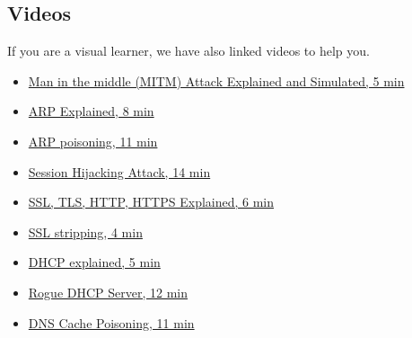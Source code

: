 \subsection{Videos}
If you are a visual learner, we have also linked videos to help you. \\
\begin{itemize}
    \item \href{https://www.youtube.com/watch?v=fbXu8EX0hsI}{Man in the middle (MITM) Attack Explained and Simulated, 5 min}
    \item \href{https://www.youtube.com/watch?v=tXzKjtMHgWI}{ARP Explained, 8 min}
    \item \href{https://www.youtube.com/watch?v=A7nih6SANYs}{ARP poisoning, 11 min}
    \item \href{https://www.youtube.com/watch?v=oI7dX6DWyTo}{Session Hijacking Attack, 14 min}
    \item \href{https://www.youtube.com/watch?v=hExRDVZHhig}{SSL, TLS, HTTP, HTTPS Explained, 6 min}
    \item \href{https://www.youtube.com/watch?v=99YNg8UAesI}{SSL stripping, 4 min}    \item \href{https://www.youtube.com/watch?v=S43CFcpOZSI}{DHCP explained, 5 min}
    \item \href{https://www.youtube.com/watch?v=eWVzteyRFYo}{Rogue DHCP Server, 12 min}
    \item \href{https://www.youtube.com/watch?v=7MT1F0O3_Yw}{DNS Cache Poisoning, 11 min}
\end{itemize}
